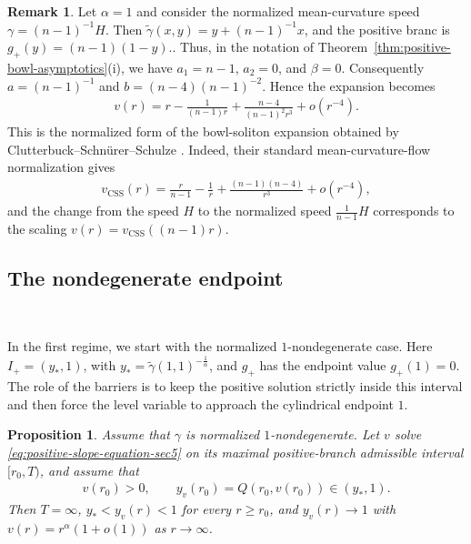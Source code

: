 \documentclass{amsart}
\theoremstyle{plain}
\newtheorem{proposition}[theorem]{Proposition}
\theoremstyle{mainintrothm}
\theoremstyle{definition}
\newtheorem{remark}[theorem]{Remark}
\begin{document}
	\begin{remark}
		\label{rem:normalized-mean-curvature-check}
		Let $\alpha=1$ and consider the normalized mean-curvature speed
		$\gamma=(n-1)^{-1}H$. Then $\widetilde\gamma(x,y)=y+(n-1)^{-1}x$, and  the positive branc is $	g_+(y)=(n-1)(1-y).$. Thus, in the notation of
		Theorem~\ref{thm:positive-bowl-asymptotics}\textup{(i)}, we have
		$a_1=n-1$, $a_2=0$, and $\beta=0$.  Consequently $a=(n-1)^{-1}$ and  $b=(n-4)(n-1)^{-2}$. Hence the expansion becomes
		\begin{align*}
			v(r)
			=
			r
			-
			\frac{1}{(n-1)r}
			+
			\frac{n-4}{(n-1)^2r^3}
			+
			o(r^{-4}).
		\end{align*}
		This is the normalized form of the bowl-soliton expansion obtained by
		Clutterbuck--Schn\"urer--Schulze \cite{clutterbuck2007stability}.  Indeed,
		their standard mean-curvature-flow normalization gives
		\begin{align*}
			v_{\mathrm{CSS}}(r)
			=
			\frac{r}{n-1}
			-
			\frac{1}{r}
			+
			\frac{(n-1)(n-4)}{r^3}
			+
			o(r^{-4}),
		\end{align*}
		and the change from the speed $H$ to the normalized speed
		$\frac{1}{n-1}H$ corresponds to the scaling
		$v(r)=v_{\mathrm{CSS}}((n-1)r)$.
	\end{remark}
	
	
	\subsection{The nondegenerate endpoint}\,
	\label{subsec:one-nondegenerate-asymptotics}
	
	In the first regime, we start with the normalized $1$-nondegenerate case.  Here
	$I_+=(y_*,1)$, with $y_*=\widetilde\gamma(1,1)^{-\frac{1}{\alpha}}$, and
	$g_+$ has the endpoint value $g_+(1)=0$.  The role of the barriers is to keep
	the positive solution strictly inside this interval and then force the level
	variable to approach the cylindrical endpoint $1$.
	
	\begin{proposition}
		\label{prop:positive-end-leading-order}
		Assume that $\gamma$ is normalized $1$-nondegenerate.  Let $v$ solve
		\eqref{eq:positive-slope-equation-sec5} on its maximal positive-branch
		admissible interval $[r_0,T)$, and assume that
		\begin{align*}
			v(r_0)>0,
			\qquad
			y_v(r_0)=Q(r_0,v(r_0))\in(y_*,1).
		\end{align*}
		Then $T=\infty$, $y_*<y_v(r)<1$ for every $r\ge r_0$, and $y_v(r)\to1$ with $v(r)=r^\alpha(1+o(1))$ as $r\to\infty$.
	\end{proposition}
	
\end{document}
